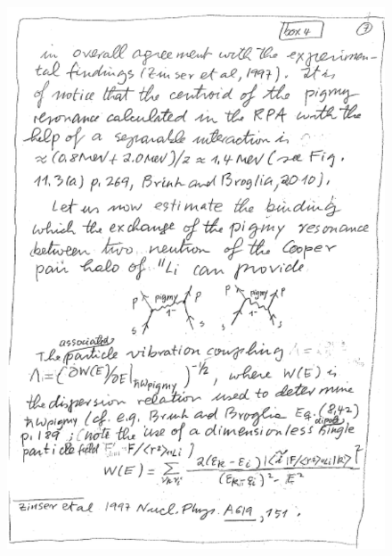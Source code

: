 \documentclass[a4paper,11pt]{book}
\numberwithin{equation}{section}
\numberwithin{figure}{section}
\numberwithin{table}{section}
\begin{document}
\begin{figure}
\centerline{\includegraphics*[width=\textwidth,angle=0]{figs/box4_2.pdf}}
\end{figure}
\end{document}
